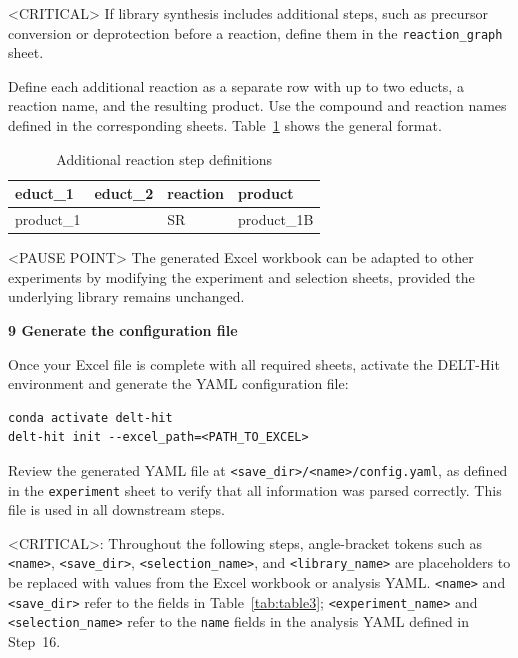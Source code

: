 \documentclass[pdflatex,sn-nature]{sn-jnl}
\newcommand{\protocolstep}[2]{\par\medskip\noindent\textbf{#1 \textbar{} #2}\par}
\begin{document}
<CRITICAL> If library synthesis includes additional steps, such as precursor conversion or deprotection before a reaction, define them in the \texttt{reaction\_graph} sheet.


Define each additional reaction as a separate row with up to two educts, a reaction name, and the resulting product. Use the compound and reaction names defined in the corresponding sheets. Table~\ref{tab:table10} shows the general format.

\begin{table}[htbp]
\centering
\caption{Additional reaction step definitions}
\label{tab:table10}
\begin{tabular}{llll}
\toprule
educt\_1 & educt\_2 & reaction & product \\
\midrule
product\_1 &  & SR & product\_1B \\
\bottomrule
\end{tabular}
\end{table}
<PAUSE POINT> The generated Excel workbook can be adapted to other experiments by modifying the experiment and selection sheets, provided the underlying library remains unchanged.

\protocolstep{9}{Generate the configuration file}
Once your Excel file is complete with all required sheets, activate the DELT-Hit environment and generate the YAML configuration file:


\begin{lstlisting}
conda activate delt-hit
delt-hit init --excel_path=<PATH_TO_EXCEL>
\end{lstlisting}

Review the generated YAML file at \texttt{\textless save\_dir\textgreater/\textless name\textgreater/config.yaml}, as defined in the \texttt{experiment} sheet to verify that all information was parsed correctly. This file is used in all downstream steps.

<CRITICAL>: Throughout the following steps, angle-bracket tokens such as \texttt{\textless name\textgreater}, \texttt{\textless save\_dir\textgreater}, \texttt{\textless selection\_name\textgreater}, and \texttt{\textless library\_name\textgreater} are placeholders to be replaced with values from the Excel workbook or analysis YAML. \texttt{\textless name\textgreater} and \texttt{\textless save\_dir\textgreater} refer to the fields in Table~\ref{tab:table3}; \texttt{\textless experiment\_name\textgreater} and \texttt{\textless selection\_name\textgreater} refer to the \texttt{name} fields in the analysis YAML defined in Step~16.
\end{document}
